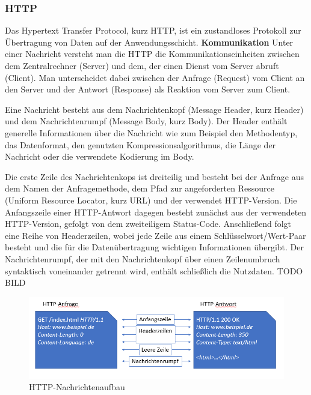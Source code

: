 \subsubsection{HTTP}
Das Hypertext Transfer Protocol, kurz HTTP, ist ein zustandloses Protokoll zur Übertragung von Daten auf der Anwendungsschicht.
\newline
\newline
\textbf{Kommunikation}
\newline
Unter einer Nachricht versteht man die HTTP die Kommunikationseinheiten zwischen dem Zentralrechner (Server) und dem, der einen Dienst vom Server abruft (Client). Man unterscheidet dabei zwischen der Anfrage (Request) vom Client an den Server und der Antwort (Response) als Reaktion vom Server zum Client. 
\newline

Eine Nachricht besteht aus dem Nachrichtenkopf (Message Header, kurz Header) und dem Nachrichtenrumpf (Message Body, kurz Body). Der Header enthält generelle Informationen über die Nachricht wie zum Beispiel den Methodentyp, das Datenformat, den genutzten Kompressionsalgorithmus, die Länge der Nachricht oder die verwendete Kodierung im Body. 
\newline

Die erste Zeile des Nachrichtenkops ist dreiteilig und besteht bei der Anfrage aus dem Namen der Anfragemethode, dem Pfad zur angeforderten Ressource (Uniform Resource Locator, kurz URL) und der verwendet HTTP-Version. Die Anfangszeile einer HTTP-Antwort dagegen besteht zunächst aus der verwendeten HTTP-Version, gefolgt von dem zweiteiligem Status-Code. Anschließend folgt eine Reihe von Headerzeilen, wobei jede Zeile aus einem Schlüsselwort/Wert-Paar besteht und die für die Datenübertragung wichtigen Informationen übergibt. Der Nachrichtenrumpf, der mit den Nachrichtenkopf über einen Zeilenumbruch syntaktisch voneinander getrennt wird, enthält schließlich die Nutzdaten. TODO BILD
\newline

\begin{figure}[h]
\centering
\includegraphics[width=\textwidth]{images/netzwerkprotokolle_http.PNG}
\caption{HTTP-Nachrichtenaufbau}
\end{figure}

